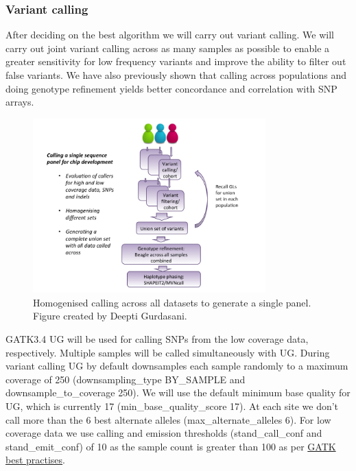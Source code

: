 \subsubsection{Variant calling}
After deciding on the best algorithm we will carry out variant calling. We will carry out joint variant calling across as many samples as possible to enable a greater sensitivity for low frequency variants and improve the ability to filter out false variants. We have also previously shown that calling across populations and doing genotype refinement yields better concordance and correlation with SNP arrays.

\begin{figure}[!htbp]
\centering
\includegraphics[width=0.8\textwidth]{ADRP/figures/calling}
\caption[Homogenised calling across all datasets to generate a single panel]{Homogenised calling across all datasets to generate a single panel. Figure created by Deepti Gurdasani.}
\label{fig:calling}
\end{figure}
GATK3.4 \gls{UG} will be used for calling SNPs from the low coverage data, respectively. Multiple samples will be called simultaneously with \gls{UG}. During variant calling \gls{UG} by default downsamples each sample randomly to a maximum coverage of 250 (\-\-downsampling\_type BY\_SAMPLE and \-\-downsample\_to\_coverage 250). We will use the default minimum base quality for UG, which is currently 17 (\-\-min\_base\_quality\_score 17). %
At each site we don't call more than the 6 best alternate alleles (\-\-max\_alternate\_alleles 6).
For low coverage data we use calling and emission thresholds (\-stand\_call\_conf and \-stand\_emit\_conf) of 10 as the sample count is greater than 100 as per \href{https://www.broadinstitute.org/gatk/guide/pdfdocs/GATK_GuideBook_2.7-4.pdf}{GATK best practises}. %

